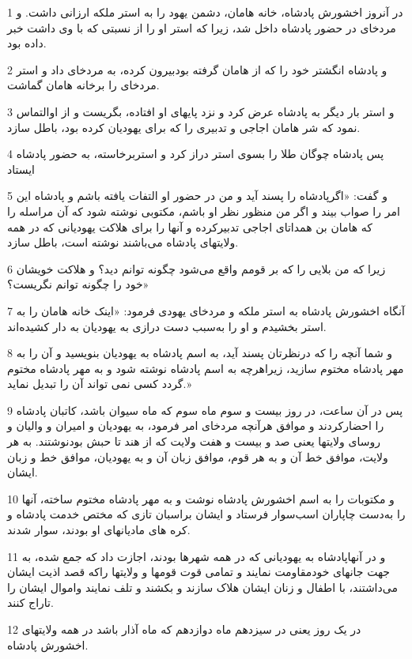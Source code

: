 \par 1 در آنروز اخشورش پادشاه، خانه هامان، دشمن یهود را به استر ملکه ارزانی داشت. و مردخای در حضور پادشاه داخل شد، زیرا که استر او را از نسبتی که با وی داشت خبر داده بود.
\par 2 و پادشاه انگشتر خود را که از هامان گرفته بودبیرون کرده، به مردخای داد و استر مردخای را برخانه هامان گماشت.
\par 3 و استر بار دیگر به پادشاه عرض کرد و نزد پایهای او افتاده، بگریست و از اوالتماس نمود که شر هامان اجاجی و تدبیری را که برای یهودیان کرده بود، باطل سازد.
\par 4 پس پادشاه چوگان طلا را بسوی استر دراز کرد و استربرخاسته، به حضور پادشاه ایستاد
\par 5 و گفت: «اگرپادشاه را پسند آید و من در حضور او التفات یافته باشم و پادشاه این امر را صواب بیند و اگر من منظور نظر او باشم، مکتوبی نوشته شود که آن مراسله را که هامان بن همداتای اجاجی تدبیرکرده و آنها را برای هلاکت یهودیانی که در همه ولایتهای پادشاه می‌باشند نوشته است، باطل سازد.
\par 6 زیرا که من بلایی را که بر قومم واقع می‌شود چگونه توانم دید؟ و هلاکت خویشان خود را چگونه توانم نگریست؟»
\par 7 آنگاه اخشورش پادشاه به استر ملکه و مردخای یهودی فرمود: «اینک خانه هامان را به استر بخشیدم و او را به‌سبب دست درازی به یهودیان به دار کشیده‌اند.
\par 8 و شما آنچه را که درنظرتان پسند آید، به اسم پادشاه به یهودیان بنویسید و آن را به مهر پادشاه مختوم سازید، زیراهرچه به اسم پادشاه نوشته شود و به مهر پادشاه مختوم گردد کسی نمی تواند آن را تبدیل نماید.»
\par 9 پس در آن ساعت، در روز بیست و سوم ماه سوم که ماه سیوان باشد، کاتبان پادشاه را احضارکردند و موافق هر‌آنچه مردخای امر فرمود، به یهودیان و امیران و والیان و روسای ولایتها یعنی صد و بیست و هفت ولایت که از هند تا حبش بودنوشتند. به هر ولایت، موافق خط آن و به هر قوم، موافق زبان آن و به یهودیان، موافق خط و زبان ایشان.
\par 10 و مکتوبات را به اسم اخشورش پادشاه نوشت و به مهر پادشاه مختوم ساخته، آنها را به‌دست چاپاران اسب‌سوار فرستاد و ایشان براسبان تازی که مختص خدمت پادشاه و کره های مادیانهای او بودند، سوار شدند. 
\par 11 و در آنهاپادشاه به یهودیانی که در همه شهرها بودند، اجازت داد که جمع شده، به جهت جانهای خودمقاومت نمایند و تمامی قوت قومها و ولایتها راکه قصد اذیت ایشان می‌داشتند، با اطفال و زنان ایشان هلاک سازند و بکشند و تلف نمایند واموال ایشان را تاراج کنند.
\par 12 در یک روز یعنی در سیزدهم ماه دوازدهم که ماه آذار باشد در همه ولایتهای اخشورش پادشاه.

